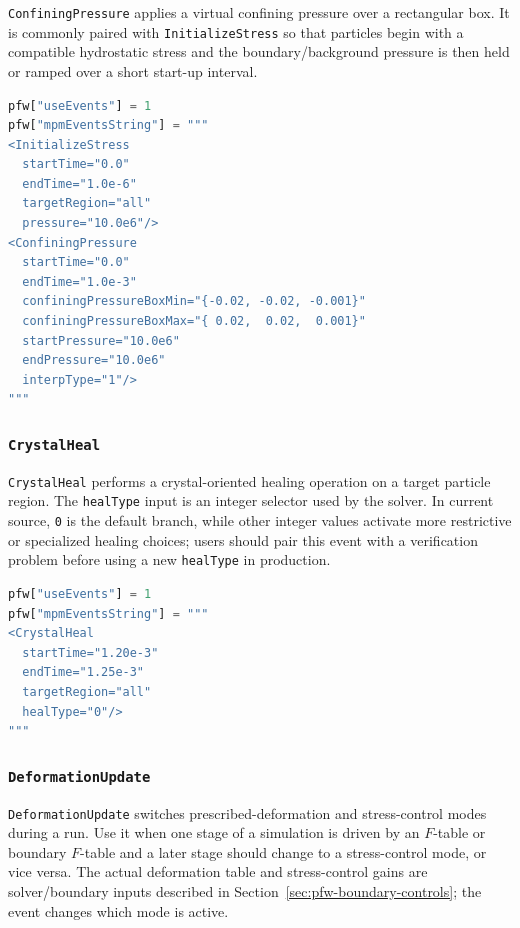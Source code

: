 \texttt{ConfiningPressure} applies a virtual confining pressure over a rectangular box.  It is commonly paired with \texttt{InitializeStress} so that particles begin with a compatible hydrostatic stress and the boundary/background pressure is then held or ramped over a short start-up interval.

\begin{lstlisting}[language=Python,caption={Confining-pressure event.}]
pfw["useEvents"] = 1
pfw["mpmEventsString"] = """
<InitializeStress
  startTime="0.0"
  endTime="1.0e-6"
  targetRegion="all"
  pressure="10.0e6"/>
<ConfiningPressure
  startTime="0.0"
  endTime="1.0e-3"
  confiningPressureBoxMin="{-0.02, -0.02, -0.001}"
  confiningPressureBoxMax="{ 0.02,  0.02,  0.001}"
  startPressure="10.0e6"
  endPressure="10.0e6"
  interpType="1"/>
"""
\end{lstlisting}

\subsubsection{\texttt{CrystalHeal}}

\texttt{CrystalHeal} performs a crystal-oriented healing operation on a target particle region.  The \texttt{healType} input is an integer selector used by the solver.  In current source, \texttt{0} is the default branch, while other integer values activate more restrictive or specialized healing choices; users should pair this event with a verification problem before using a new \texttt{healType} in production.

\begin{lstlisting}[language=Python,caption={Crystal-healing event.}]
pfw["useEvents"] = 1
pfw["mpmEventsString"] = """
<CrystalHeal
  startTime="1.20e-3"
  endTime="1.25e-3"
  targetRegion="all"
  healType="0"/>
"""
\end{lstlisting}

\subsubsection{\texttt{DeformationUpdate}}

\texttt{DeformationUpdate} switches prescribed-deformation and stress-control modes during a run.  Use it when one stage of a simulation is driven by an \(F\)-table or boundary \(F\)-table and a later stage should change to a stress-control mode, or vice versa.  The actual deformation table and stress-control gains are solver/boundary inputs described in Section~\ref{sec:pfw-boundary-controls}; the event changes which mode is active.

